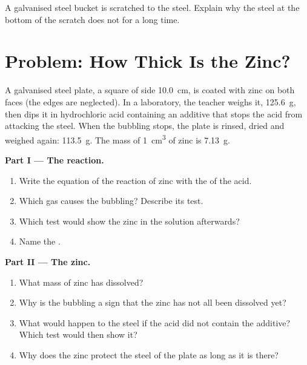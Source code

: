 \begin{exercise}[$\star\star\star$]\label{exo:g9:metals-acids-corrosion:12}
A galvanised steel bucket is scratched to the steel. Explain why the
steel at the bottom of the scratch does not  for a long time.
\end{exercise}

\section{Problem: How Thick Is the Zinc?}

\begin{problem}
\label{pb:g9:metals-acids-corrosion:1}
A galvanised steel plate, a square of side \qty{10.0}{cm}, is coated with
zinc on both faces (the edges are neglected). In a laboratory, the teacher
weighs it, \qty{125.6}{g}, then dips it in hydrochloric acid containing an
additive that stops the acid from attacking the steel. When the bubbling
stops, the plate is rinsed, dried and weighed again: \qty{113.5}{g}. The
mass of \qty{1}{cm^3} of zinc is \qty{7.13}{g}.

\medskip
\noindent\textbf{Part I --- The reaction.}
\begin{enumerate}
  \item Write the equation of the reaction of zinc with the  
        of the acid.
  \item Which gas causes the bubbling? Describe its test.
  \item Which test would show the zinc  in the solution afterwards?
  \item Name the .
\end{enumerate}

\medskip
\noindent\textbf{Part II --- The zinc.}
\begin{enumerate}[resume]
  \item What mass of zinc has dissolved?
  \item Why is the bubbling a sign that the zinc has not all been
        dissolved yet?
  \item What would happen to the steel if the acid did not contain the
        additive? Which test would then show it?
  \item Why does the zinc protect the steel of the plate as long as it is
        there?
\end{enumerate}


\end{problem}
